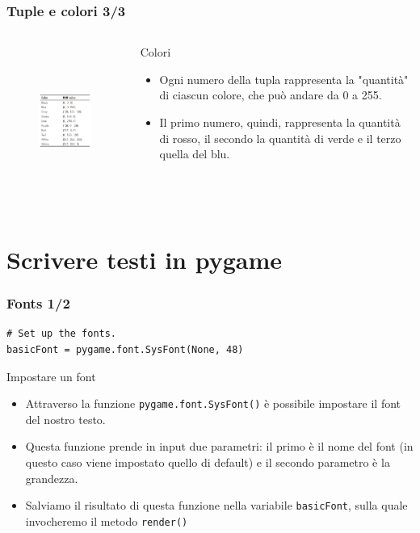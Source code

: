 \documentclass{beamer}
\begin{document}
\begin{frame}[fragile]
\frametitle{Tuple e colori 3/3}
\begin{columns}[T]
	\begin{column}[T]{0.55\textwidth}
		\begin{figure}[t]
			\includegraphics[height=5cm, width=6cm]{images/TabellaColori.png}
		\end{figure}
	\end{column}
	\begin{column}[T]{0.45\textwidth}
		\begin{block}{Colori}
			\begin{itemize}
				\item Ogni numero della tupla rappresenta la "quantità" di ciascun colore, che può andare da 0 a 255.
				\item Il primo numero, quindi, rappresenta la quantità di rosso, il secondo la quantità di verde e il terzo quella del blu.
			\end{itemize}
		\end{block}
	\end{column}
\end{columns}
\end{frame}

\section{Scrivere testi in pygame}

\begin{frame}[fragile]
\frametitle{Fonts 1/2}
\begin{lstlisting}
# Set up the fonts.
basicFont = pygame.font.SysFont(None, 48)
\end{lstlisting}
\begin{block}{Impostare un font}
	\begin{itemize}
		\item Attraverso la funzione \texttt{pygame.font.SysFont()} è possibile impostare il font del nostro testo.
		\item Questa funzione prende in input due parametri: il primo è il nome del font (in questo caso viene impostato quello di default) e il secondo parametro è la grandezza.
		\item Salviamo il risultato di questa funzione nella variabile \texttt{basicFont}, sulla quale invocheremo il metodo \texttt{render()}
	\end{itemize}
\end{block}
\end{frame}
\end{document}
